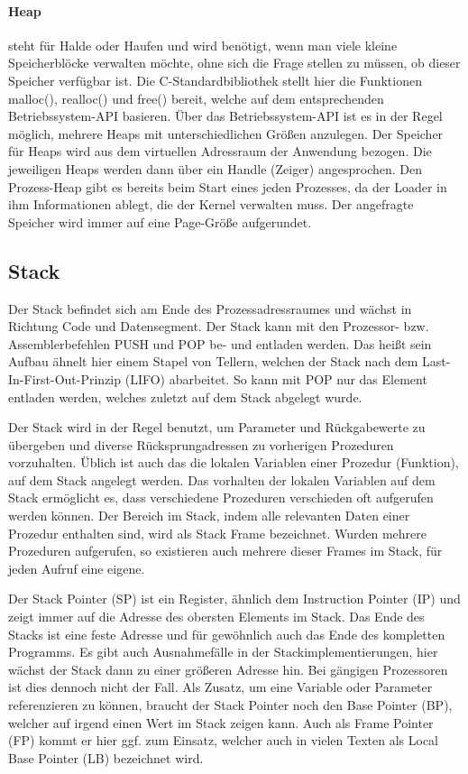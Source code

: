 \documentclass[12pt]{book}
\begin{document}
\paragraph{Heap}

steht für Halde oder Haufen und wird benötigt, wenn man viele kleine
Speicherblöcke verwalten möchte, ohne sich die Frage stellen zu müssen, ob
dieser Speicher verfügbar ist. Die C-Standardbibliothek stellt hier die
Funktionen malloc(), realloc() und free() bereit, welche auf dem entsprechenden
Betriebssystem-API basieren. Über das Betriebssystem-API ist es in der Regel
möglich, mehrere Heaps mit unterschiedlichen Größen anzulegen. Der Speicher für
Heaps wird aus dem virtuellen Adressraum der Anwendung bezogen. Die jeweiligen
Heaps werden dann über ein Handle (Zeiger) angesprochen. Den Prozess-Heap gibt
es bereits beim Start eines jeden Prozesses, da der Loader in ihm Informationen
ablegt, die der Kernel verwalten muss. Der angefragte Speicher wird immer
auf eine Page-Größe aufgerundet.

\subsection{Stack}

Der Stack befindet sich am Ende des Prozessadressraumes und wächst in Richtung
Code und Datensegment. Der Stack kann mit den Prozessor- bzw. Assemblerbefehlen
PUSH und POP be- und entladen werden. Das heißt sein Aufbau ähnelt hier einem
Stapel von Tellern, welchen der Stack nach dem Last-In-First-Out-Prinzip (LIFO)
abarbeitet. So kann mit POP nur das Element entladen werden, welches zuletzt
auf dem Stack abgelegt wurde.

Der Stack wird in der Regel benutzt, um Parameter und Rückgabewerte zu übergeben
und diverse Rücksprungadressen zu vorherigen Prozeduren vorzuhalten.  Üblich ist
auch das die lokalen Variablen einer Prozedur (Funktion), auf dem Stack angelegt
werden. Das vorhalten der lokalen Variablen auf dem Stack ermöglicht es, dass
verschiedene Prozeduren verschieden oft aufgerufen werden können. Der Bereich im
Stack, indem alle relevanten Daten einer Prozedur enthalten sind, wird als Stack
Frame bezeichnet. Wurden mehrere Prozeduren aufgerufen, so existieren auch
mehrere dieser Frames im Stack, für jeden Aufruf eine eigene.

Der Stack Pointer (SP) ist ein Register, ähnlich dem Instruction Pointer (IP)
und zeigt immer auf die Adresse des obersten Elements im Stack. Das Ende des
Stacks ist eine feste Adresse und für gewöhnlich auch das Ende des kompletten
Programms. Es gibt auch Ausnahmefälle in der Stackimplementierungen, hier wächst
der Stack dann zu einer größeren Adresse hin. Bei gängigen Prozessoren ist dies
dennoch nicht der Fall. Als Zusatz, um eine Variable oder Parameter
referenzieren zu können, braucht der Stack Pointer noch den Base Pointer (BP),
welcher auf irgend einen Wert im Stack zeigen kann. Auch als Frame Pointer (FP)
kommt er hier ggf. zum Einsatz, welcher auch in vielen Texten als Local Base
Pointer (LB) bezeichnet wird.
\end{document}
